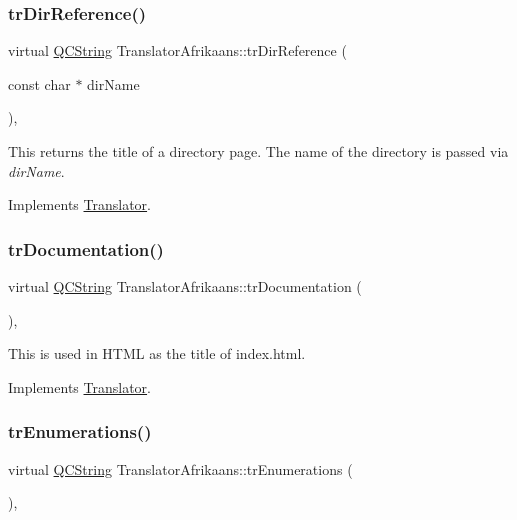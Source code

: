 \subsubsection{\texorpdfstring{trDirReference()}{trDirReference()}}
{\footnotesize\ttfamily virtual \mbox{\hyperlink{class_q_c_string}{Q\+C\+String}} Translator\+Afrikaans\+::tr\+Dir\+Reference (\begin{DoxyParamCaption}\item[{const char $\ast$}]{dir\+Name }\end{DoxyParamCaption})\hspace{0.3cm}{\ttfamily [inline]}, {\ttfamily [virtual]}}

This returns the title of a directory page. The name of the directory is passed via {\itshape dir\+Name}. 

Implements \mbox{\hyperlink{class_translator}{Translator}}.

\mbox{\label{class_translator_afrikaans_ac129bd84c2cce4a4eba9b657b657d342}} 
\subsubsection{\texorpdfstring{trDocumentation()}{trDocumentation()}}
{\footnotesize\ttfamily virtual \mbox{\hyperlink{class_q_c_string}{Q\+C\+String}} Translator\+Afrikaans\+::tr\+Documentation (\begin{DoxyParamCaption}{ }\end{DoxyParamCaption})\hspace{0.3cm}{\ttfamily [inline]}, {\ttfamily [virtual]}}

This is used in H\+T\+ML as the title of index.\+html. 

Implements \mbox{\hyperlink{class_translator}{Translator}}.

\mbox{\label{class_translator_afrikaans_aa61556dfb8844cb20f2e54dd0ca647de}} 
\subsubsection{\texorpdfstring{trEnumerations()}{trEnumerations()}}
{\footnotesize\ttfamily virtual \mbox{\hyperlink{class_q_c_string}{Q\+C\+String}} Translator\+Afrikaans\+::tr\+Enumerations (\begin{DoxyParamCaption}{ }\end{DoxyParamCaption})\hspace{0.3cm}{\ttfamily [inline]}, {\ttfamily [virtual]}}

